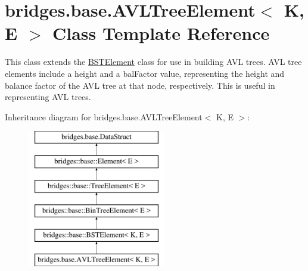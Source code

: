 \hypertarget{classbridges_1_1base_1_1_a_v_l_tree_element}{}\section{bridges.\+base.\+A\+V\+L\+Tree\+Element$<$ K, E $>$ Class Template Reference}
\label{classbridges_1_1base_1_1_a_v_l_tree_element}


This class extends the \hyperlink{classbridges_1_1base_1_1_b_s_t_element}{B\+S\+T\+Element} class for use in building A\+VL trees. A\+VL tree elements include a \textquotesingle{}height\textquotesingle{} and a \textquotesingle{}bal\+Factor\textquotesingle{} value, representing the height and balance factor of the A\+VL tree at that node, respectively. This is useful in representing A\+VL trees.  


Inheritance diagram for bridges.\+base.\+A\+V\+L\+Tree\+Element$<$ K, E $>$\+:\begin{figure}[H]
\begin{center}
\leavevmode
\includegraphics[height=6.000000cm]{classbridges_1_1base_1_1_a_v_l_tree_element}
\end{center}
\end{figure}
